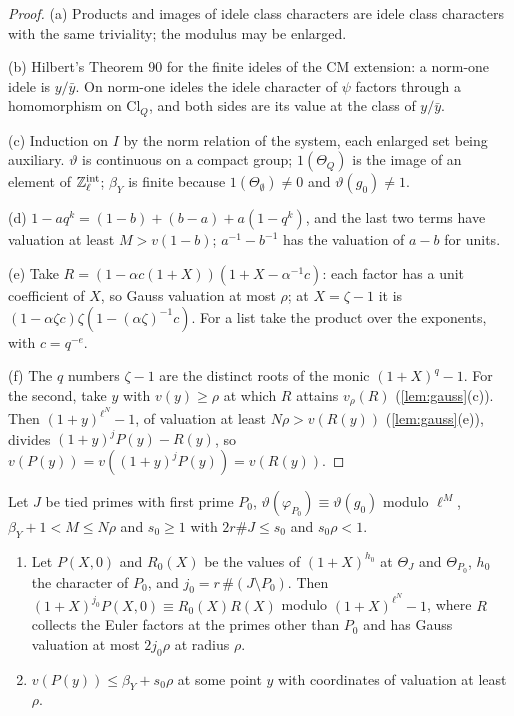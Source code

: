 \begin{proof}
(a) Products and images of idele class characters are idele class characters with the same triviality; the modulus may be enlarged.

(b) Hilbert's Theorem 90 for the finite ideles of the CM extension: a norm-one idele is $y/\bar y$. On norm-one ideles the idele character of $\psi$ factors through a homomorphism on $\mathrm{Cl}_Q$, and both sides are its value at the class of $y/\bar y$.

(c) Induction on $I$ by the norm relation of the system, each enlarged set being auxiliary. $\vartheta$ is continuous on a compact group; $1(\Theta_Q)$ is the image of an element of $\mathbb{Z}_\ell^{\rm int}$; $\beta_Y$ is finite because $1(\Theta_\emptyset)\ne0$ and $\vartheta(g_0)\ne1$.

(d) $1-aq^k=(1-b)+(b-a)+a(1-q^k)$, and the last two terms have valuation at least $M>v(1-b)$; $a^{-1}-b^{-1}$ has the valuation of $a-b$ for units.

(e) Take $R=(1-\alpha c(1+X))(1+X-\alpha^{-1}c)$: each factor has a unit coefficient of $X$, so Gauss valuation at most $\rho$; at $X=\zeta-1$ it is $(1-\alpha\zeta c)\zeta(1-(\alpha\zeta)^{-1}c)$. For a list take the product over the exponents, with $c=q^{-e}$.

(f) The $q$ numbers $\zeta-1$ are the distinct roots of the monic $(1+X)^q-1$. For the second, take $y$ with $v(y)\ge\rho$ at which $R$ attains $v_\rho(R)$ (\cref{lem:gauss}(c)). Then $(1+y)^{\ell^N}-1$, of valuation at least $N\rho>v(R(y))$ (\cref{lem:gauss}(e)), divides $(1+y)^jP(y)-R(y)$, so $v(P(y))=v((1+y)^jP(y))=v(R(y))$.
\end{proof}

\begin{proposition}\label{prop:stickelberger-line}
Let $J$ be tied primes with first prime $P_0$, $\vartheta(\varphi_{P_0})\equiv\vartheta(g_0)$ modulo $\ell^M$, $\beta_Y+1<M\le N\rho$ and $s_0\ge1$ with $2r\#J\le s_0$ and $s_0\rho<1$.
\begin{enumerate}[label=\textup{(\alph*)}]
\item Let $P(X,0)$ and $R_0(X)$ be the values of $(1+X)^{h_0}$ at $\Theta_J$ and $\Theta_{P_0}$, $h_0$ the character of $P_0$, and $j_0=r\,\#(J\setminus P_0)$. Then $(1+X)^{j_0}P(X,0)\equiv R_0(X)R(X)$ modulo $(1+X)^{\ell^N}-1$, where $R$ collects the Euler factors at the primes
other than $P_0$ and has Gauss valuation at most $2j_0\rho$ at radius $\rho$.
\item $v(P(y))\le\beta_Y+s_0\rho$ at some point $y$ with coordinates of valuation at least $\rho$.
\end{enumerate}
\end{proposition}

